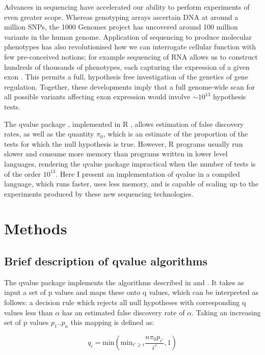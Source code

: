 \documentclass{amsart}
\begin{document}
Advances in sequencing have accelerated our ability to perform experiments of even greater scope. Whereas genotyping arrays ascertain DNA at around a million SNPs, the 1000 Genomes project \citep{1kg} has uncovered around 100 million variants in the human genome. Application of sequencing to produce molecular phenotypes has also revolutionised how we can interrogate cellular function with few pre-conceived notions; for example sequencing of RNA allows us to construct hundreds of thousands of phenotypes, each capturing the expression of a given exon \citep{geuvadis}. This permits a full, hypothesis free investigation of the genetics of gene regulation. Together, these developments imply that a full genome-wide scan for all possible variants affecting exon expression would involve $\sim 10^{13}$ hypothesis tests.

The qvalue package \citep{qvalue}, implemented in R \citep{R}, allows estimation of false discovery rates, as well as the quantity $\pi_0$, which is an estimate of the proportion of the tests for which the null hypothesis is true. However, R programs usually run slower and consume more memory than programs written in lower level languages, rendering the qvalue package impractical when the number of tests is of the order $10^{13}$. Here I present an implementation of qvalue in a compiled language, which runs faster, uses less memory, and is capable of scaling up to the experiments produced by these new sequencing technologies.

\section{Methods}

\subsection{Brief description of qvalue algorithms}

The qvalue package implements the algorithms described in \citet{storeydirect, splinestorey} and \citet{bootstorey}. It takes as input a set of p values and maps these onto q values, which can be interpreted as follows: a decision rule which rejects all null hypotheses with corresponding q values less than $\alpha$ has an estimated false discovery rate of $\alpha$. Taking an increasing set of p values $p_1..p_n$ this mapping is defined as:

\begin{equation}
\label{eq:qvalue}
q_i = \text{min}(\text{min}_{i' \geq i} \frac{n \pi_0p_{i'}} {i'}, 1)
\end{equation}
\end{document}
